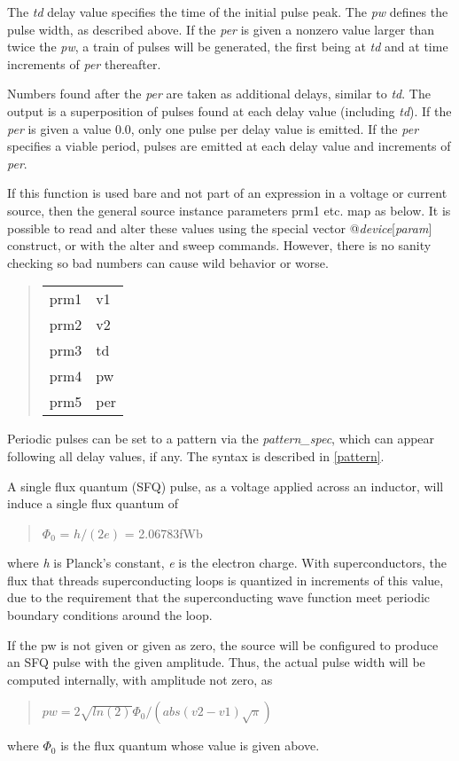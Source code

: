 The {\it td} delay value specifies the time of the initial pulse peak. 
The {\it pw} defines the pulse width, as described above.  If the {\it
per} is given a nonzero value larger than twice the {\it pw}, a train
of pulses will be generated, the first being at {\it td} and at time
increments of {\it per} thereafter.

Numbers found after the {\it per} are taken as additional delays,
similar to {\it td\/}.  The output is a superposition of pulses found
at each delay value (including {\it td\/}).  If the {\it per} is given
a value 0.0, only one pulse per delay value is emitted.  If the {\it
per} specifies a viable period, pulses are emitted at each delay value
and increments of {\it per\/}.

If this function is used bare and not part of an expression in a
voltage or current source, then the general source instance parameters
{\vt prm1} etc.  map as below.  It is possible to read and alter these
values using the special vector @{\it device}[{\it param\/}]
construct, or with the {\cb alter} and {\cb sweep} commands.  However,
there is no sanity checking so bad numbers can cause wild behavior or
worse.

\begin{quote}
\begin{tabular}{ll}
prm1 & v1\\
prm2 & v2\\
prm3 & td\\
prm4 & pw\\
prm5 & per\\
\end{tabular}
\end{quote}

Periodic pulses can be set to a pattern via the {\it pattern\_spec},
which can appear following all delay values, if any.  The syntax is
described in \ref{pattern}.

A single flux quantum (SFQ) pulse, as a voltage applied across an
inductor, will induce a single flux quantum of
\begin{quote}
 $\Phi_0$ = $h/(2e)$ = 2.06783fWb
\end{quote}
where {\it h} is Planck's constant, {\it e} is the electron charge. 
With superconductors, the flux that threads superconducting loops is
quantized in increments of this value, due to the requirement that the
superconducting wave function meet periodic boundary conditions around
the loop.

If the {\vt pw} is not given or given as zero, the source will be
configured to produce an SFQ pulse with the given amplitude.  Thus,
the actual pulse width will be computed internally, with amplitude not
zero, as
\begin{quote}
$pw = 2\sqrt{ln(2)}\Phi_0/(abs(v2-v1)\sqrt\pi)$
\end{quote}
where $\Phi_0$ is the flux quantum whose value is given above.

